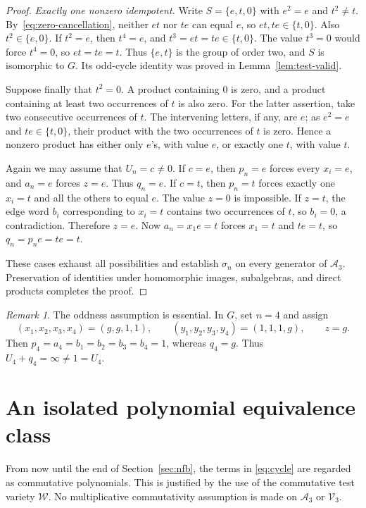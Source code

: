 \documentclass[11pt,reqno]{amsart}
\numberwithin{equation}{section}
\theoremstyle{definition}
\theoremstyle{remark}
\newtheorem{remark}[theorem]{Remark}
\newcommand{\Vthree}{\mathcal V_3}
\newcommand{\Athree}{\mathcal A_3}
\newcommand{\W}{\mathcal W}
\begin{document}
\begin{proof}
\emph{Exactly one nonzero idempotent.}
Write $S=\{e,t,0\}$ with $e^2=e$ and $t^2\ne t$.
By~\eqref{eq:zero-cancellation}, neither $et$ nor $te$ can
equal $e$, so $et,te\in\{t,0\}$. Also $t^2\in\{e,0\}$.
If $t^2=e$, then $t^4=e$, and
$t^3=et=te\in\{t,0\}$. The value $t^3=0$ would force
$t^4=0$, so $et=te=t$. Thus $\{e,t\}$ is the group of
order two, and $S$ is isomorphic to $G$. Its odd-cycle
identity was proved in Lemma~\ref{lem:test-valid}.

Suppose finally that $t^2=0$. A product containing $0$ is
zero, and a product containing at least two occurrences of
$t$ is also zero. For the latter assertion, take two
consecutive occurrences of $t$. The intervening letters,
if any, are $e$; as $e^2=e$ and $te\in\{t,0\}$, their
product with the two occurrences of $t$ is zero. Hence a
nonzero product has either only $e$'s, with value $e$, or
exactly one $t$, with value $t$.

Again we may assume that $U_n=c\ne0$. If $c=e$, then
$p_n=e$ forces every $x_i=e$, and $a_n=e$ forces $z=e$.
Thus $q_n=e$. If $c=t$, then $p_n=t$ forces exactly one
$x_i=t$ and all the others to equal $e$. The value $z=0$
is impossible. If $z=t$, the edge word $b_i$ corresponding
to $x_i=t$ contains two occurrences of $t$, so $b_i=0$,
a contradiction. Therefore $z=e$. Now $a_n=x_1e=t$ forces
$x_1=t$ and $te=t$, so $q_n=p_ne=te=t$.

These cases exhaust all possibilities and establish $\sigma_n$
on every generator of $\Athree$. Preservation of identities
under homomorphic images, subalgebras, and direct products
completes the proof.
\end{proof}

\begin{remark}
The oddness assumption is essential. In $G$, set $n=4$ and assign
\[
(x_1,x_2,x_3,x_4)=(g,g,1,1),\qquad
(y_1,y_2,y_3,y_4)=(1,1,1,g),\qquad z=g.
\]
Then $p_4=a_4=b_1=b_2=b_3=b_4=1$, whereas $q_4=g$.
Thus $U_4+q_4=\infty\ne1=U_4$.
\end{remark}

\section{An isolated polynomial equivalence class}
\label{sec:isolation}

From now until the end of Section~\ref{sec:nfb}, the terms in
\eqref{eq:cycle} are regarded as commutative polynomials.
This is justified by the use of the commutative test variety $\W$.
No multiplicative commutativity assumption is made on $\Athree$
or $\Vthree$.
\end{document}
